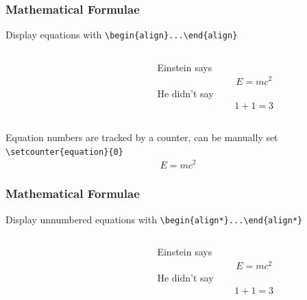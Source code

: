 \documentclass[11pt]{beamer}
\begin{document}
\begin{frame}[fragile]\frametitle{Mathematical Formulae}
Display equations with \verb+\begin{align}...\end{align}+
\begin{columns}
	\begin{column}{0.5\textwidth}
	\end{column}
	\begin{column}[T]{0.5\textwidth}
		Einstein says
		\begin{align}
			E = mc^2 
		\end{align}
		He didn’t say
		\begin{align}
			1 + 1 = 3 
		\end{align}
	\end{column}
\end{columns}
\only Equation numbers are tracked by a counter, can be manually set \verb+\setcounter{equation}{0}+ \setcounter{equation}{0}\\
\begin{align}
			E = mc^2 
		\end{align}
\end{frame}

\begin{frame}[fragile]\frametitle{Mathematical Formulae}
Display unnumbered equations with \verb+\begin{align*}...\end{align*}+
\begin{columns}
	\begin{column}{0.5\textwidth}
	\end{column}
	\begin{column}[T]{0.5\textwidth}
		Einstein says
		\begin{align*}
			E = mc^2 
		\end{align*}
		He didn’t say
		\begin{align*}
			1 + 1 = 3 
		\end{align*}
	\end{column}
\end{columns}
\end{frame}
\end{document}
